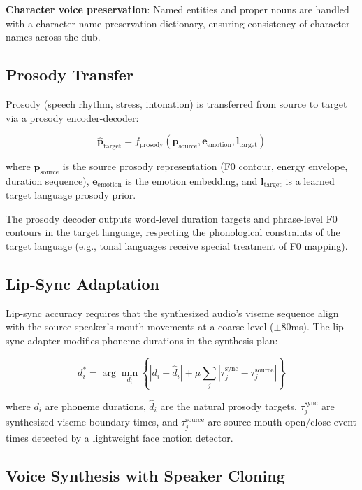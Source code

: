 \documentclass[11pt,a4paper]{article}
\begin{document}
\textbf{Character voice preservation}: Named entities and proper nouns are handled
with a character name preservation dictionary, ensuring consistency of character
names across the dub.

\subsection{Prosody Transfer}

Prosody (speech rhythm, stress, intonation) is transferred from source to target
via a prosody encoder-decoder:

\begin{equation}
\hat{\mathbf{p}}_{\text{target}} = f_{\text{prosody}}\!\left(\mathbf{p}_{\text{source}}, \mathbf{e}_{\text{emotion}}, \mathbf{l}_{\text{target}}\right)
\end{equation}

where $\mathbf{p}_{\text{source}}$ is the source prosody representation (F0 contour,
energy envelope, duration sequence), $\mathbf{e}_{\text{emotion}}$ is the emotion
embedding, and $\mathbf{l}_{\text{target}}$ is a learned target language prosody prior.

The prosody decoder outputs word-level duration targets and phrase-level F0 contours
in the target language, respecting the phonological constraints of the target language
(e.g., tonal languages receive special treatment of F0 mapping).

\subsection{Lip-Sync Adaptation}

Lip-sync accuracy requires that the synthesized audio's viseme sequence align with
the source speaker's mouth movements at a coarse level ($\pm$80ms). The lip-sync
adapter modifies phoneme durations in the synthesis plan:

\begin{equation}
d_i^* = \arg\min_{d_i} \left\{ |d_i - \hat{d}_i| + \mu \sum_j | \tau_j^{\text{sync}} - \tau_j^{\text{source}} | \right\}
\end{equation}

where $d_i$ are phoneme durations, $\hat{d}_i$ are the natural prosody targets,
$\tau_j^{\text{sync}}$ are synthesized viseme boundary times, and $\tau_j^{\text{source}}$
are source mouth-open/close event times detected by a lightweight face motion detector.

\subsection{Voice Synthesis with Speaker Cloning}
\end{document}
